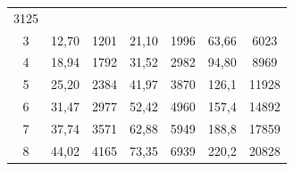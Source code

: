 \begin{table}[h!]
\begin{tabular}{c|c|c|c|c|c|c}
3125 \\


3& 

12,70& 

1201& 

21,10& 

1996& 

63,66& 

6023 \\


4& 

18,94& 

1792& 

31,52& 

2982& 

94,80& 

8969 \\


5& 

25,20& 

2384& 

41,97& 

3870& 

126,1& 

11928 \\


6& 

31,47& 

2977& 

52,42& 

4960& 

157,4& 

14892 \\


7& 

37,74& 

3571& 

62,88& 

5949& 

188,8& 

17859 \\


8& 

44,02& 

4165& 

73,35& 

6939& 

220,2& 

20828 \\


\end{tabular}
\end{table}
